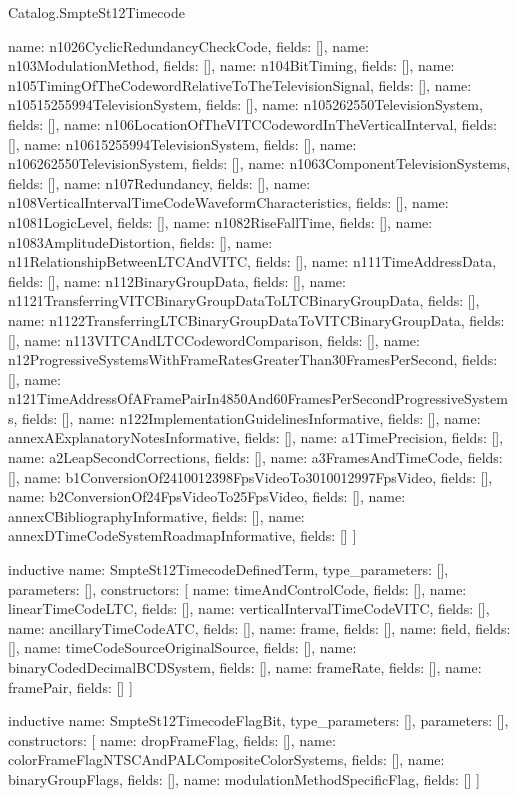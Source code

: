 \begin{lexlean}{Catalog.SmpteSt12Timecode}
\begin{semanticmodule}
{    {name: n1026CyclicRedundancyCheckCode, fields: []},
    {name: n103ModulationMethod, fields: []},
    {name: n104BitTiming, fields: []},
    {name: n105TimingOfTheCodewordRelativeToTheTelevisionSignal, fields: []},
    {name: n10515255994TelevisionSystem, fields: []},
    {name: n105262550TelevisionSystem, fields: []},
    {name: n106LocationOfTheVITCCodewordInTheVerticalInterval, fields: []},
    {name: n10615255994TelevisionSystem, fields: []},
    {name: n106262550TelevisionSystem, fields: []},
    {name: n1063ComponentTelevisionSystems, fields: []},
    {name: n107Redundancy, fields: []},
    {name: n108VerticalIntervalTimeCodeWaveformCharacteristics, fields: []},
    {name: n1081LogicLevel, fields: []},
    {name: n1082RiseFallTime, fields: []},
    {name: n1083AmplitudeDistortion, fields: []},
    {name: n11RelationshipBetweenLTCAndVITC, fields: []},
    {name: n111TimeAddressData, fields: []},
    {name: n112BinaryGroupData, fields: []},
    {name: n1121TransferringVITCBinaryGroupDataToLTCBinaryGroupData, fields: []},
    {name: n1122TransferringLTCBinaryGroupDataToVITCBinaryGroupData, fields: []},
    {name: n113VITCAndLTCCodewordComparison, fields: []},
    {name: n12ProgressiveSystemsWithFrameRatesGreaterThan30FramesPerSecond, fields: []},
    {name: n121TimeAddressOfAFramePairIn4850And60FramesPerSecondProgressiveSystems, fields: []},
    {name: n122ImplementationGuidelinesInformative, fields: []},
    {name: annexAExplanatoryNotesInformative, fields: []},
    {name: a1TimePrecision, fields: []},
    {name: a2LeapSecondCorrections, fields: []},
    {name: a3FramesAndTimeCode, fields: []},
    {name: b1ConversionOf2410012398FpsVideoTo3010012997FpsVideo, fields: []},
    {name: b2ConversionOf24FpsVideoTo25FpsVideo, fields: []},
    {name: annexCBibliographyInformative, fields: []},
    {name: annexDTimeCodeSystemRoadmapInformative, fields: []}
  ]
}

inductive{
  name: SmpteSt12TimecodeDefinedTerm,
  type_parameters: [],
  parameters: [],
  constructors: [
    {name: timeAndControlCode, fields: []},
    {name: linearTimeCodeLTC, fields: []},
    {name: verticalIntervalTimeCodeVITC, fields: []},
    {name: ancillaryTimeCodeATC, fields: []},
    {name: frame, fields: []},
    {name: field, fields: []},
    {name: timeCodeSourceOriginalSource, fields: []},
    {name: binaryCodedDecimalBCDSystem, fields: []},
    {name: frameRate, fields: []},
    {name: framePair, fields: []}
  ]
}

inductive{
  name: SmpteSt12TimecodeFlagBit,
  type_parameters: [],
  parameters: [],
  constructors: [
    {name: dropFrameFlag, fields: []},
    {name: colorFrameFlagNTSCAndPALCompositeColorSystems, fields: []},
    {name: binaryGroupFlags, fields: []},
    {name: modulationMethodSpecificFlag, fields: []}
  ]
}


\end{semanticmodule}
\end{lexlean}
